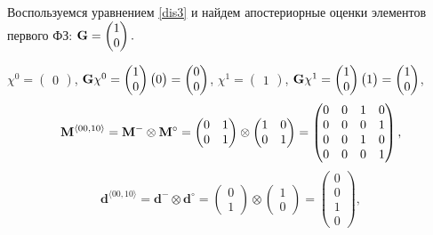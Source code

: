 Воспользуемся уравнением \ref{dis3} и найдем апостериорные оценки элементов первого ФЗ:
$ \mathbf{G} = \begin{pmatrix} 1 \\ 0 \end{pmatrix}.$

$\chi^0 = \begin{pmatrix} 0 \end{pmatrix} $, 
$\mathbf{G} \chi^0 = \begin{pmatrix} 1 \\ 0  \end{pmatrix}\begin{pmatrix} 0 \end{pmatrix} = \begin{pmatrix}  0 \\ 0 \end{pmatrix}$,
$\chi^1 = \begin{pmatrix} 1 \end{pmatrix} $, 
$\mathbf{G} \chi^1  = \begin{pmatrix} 1 \\ 0 \end{pmatrix} \begin{pmatrix} 1 \end{pmatrix}  = \begin{pmatrix}  1 \\ 0 \end{pmatrix}$,
\begin{equation*}
\mathbf{M}^{\langle 00, 10 \rangle} = \mathbf{M}^- \otimes \mathbf{M}^\circ = 
\begin{pmatrix} 0 & 1 \\ 0 & 1 \end{pmatrix} \otimes
\begin{pmatrix} 1 &0 \\ 0 & 1\end{pmatrix}  =
\begin{pmatrix} 0 &0 & 1 & 0 \\ 0 & 0 & 0 & 1 \\
0 & 0 & 1 & 0\\ 0 & 0 & 0 & 1 \end{pmatrix},
\end{equation*}
\begin{equation*}
\mathbf{d}^{\langle 00, 10 \rangle} = \mathbf{d}^- \otimes \mathbf{d}^\circ =  \begin{pmatrix} 0 \\ 1 \end{pmatrix} \otimes \begin{pmatrix}  1 \\ 0 \end{pmatrix} = \begin{pmatrix}  0 \\ 0 \\ 1 \\ 0 \end{pmatrix},
\end{equation*}

